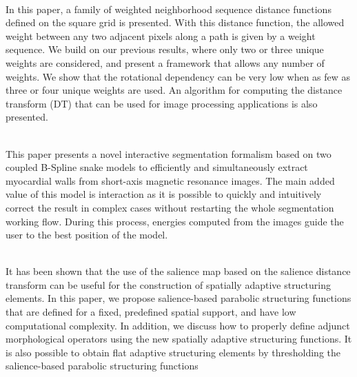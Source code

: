 {{{\begin{enumerate}
 
\\ \aabstract
In this paper, a family of weighted neighborhood sequence distance functions defined on the square grid is presented. With this distance function, the allowed weight between any two adjacent pixels along a path is given by a weight sequence. We build on our previous results, where only two or three unique weights are considered, and present a framework that allows any number of weights. We show that the rotational dependency can be very low when as few as three or four unique weights are used. An algorithm for computing the distance transform (DT) that can be used for image processing applications is also presented.

\\ \aabstract
This paper presents a novel interactive segmentation formalism based on two coupled B-Spline snake models to efficiently and simultaneously extract myocardial walls from short-axis magnetic resonance images. The main added value of this model is interaction as it is possible to quickly and intuitively correct the result in complex cases without restarting the whole segmentation working flow. During this process, energies computed from the images guide the user to the best position of the model.

\\ \aabstract
It has been shown that the use of the salience map based on the salience distance transform can be useful for the construction of spatially adaptive structuring elements. In this paper, we propose salience-based parabolic structuring functions that are defined for a fixed, predefined spatial support, and have low computational complexity. In addition, we discuss how to properly define adjunct morphological operators using the new spatially adaptive structuring functions. It is also possible to obtain flat adaptive structuring elements by thresholding the salience-based parabolic structuring functions


\end{enumerate}}}}
